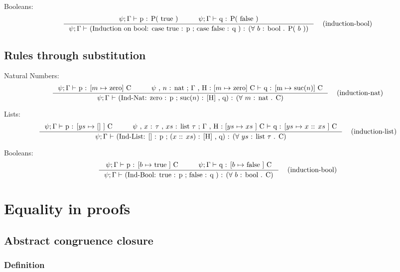 \documentclass[twoside,a4paper]{article}
\theoremstyle{definition}
\begin{document}
Booleans:
\[
\AxiomC{
$\psi ; \Gamma \vdash$ p : P( true )
}
\AxiomC{
$\psi ; \Gamma \vdash$ q : P( false )
}
\RightLabel{\quad (induction-bool)}
\BinaryInfC{
$\psi ; \Gamma \vdash$
(Induction on bool: case true : p ; case false : q )
: ($\forall$ $b$ : bool . P( $b$ ))
}
\DisplayProof
\]

\subsection{Rules through substitution}

Natural Numbers:
\[
\AxiomC{
$\psi ; \Gamma \vdash$ p : [$m$ $\mapsto$ zero] C
}
\AxiomC{
$\psi$ , $n$ : nat ; $\Gamma$ , H : [$m$ $\mapsto$ zero] C $\vdash$ q : [m $\mapsto$ suc($n$)] C
}
\RightLabel{\quad (induction-nat)}
\BinaryInfC{
$\psi ; \Gamma$ $\vdash$
(Ind-Nat: zero : p ; suc($n$) : [H] , q)
: ($\forall$ $m$ : nat . C)
}
\DisplayProof
\]

Lists:
\[
\AxiomC{
$\psi ; \Gamma \vdash$ p : [$ys$ $\mapsto$ [] ] C
}
\AxiomC{
$\psi$ , $x$ : $\tau$ , $xs$ : list $\tau$ ;
$\Gamma$ , H : [$ys$ $\mapsto$ $xs$ ] C $\vdash$ q : [$ys$ $\mapsto$ $x$ :: $xs$ ] C
}
\RightLabel{\quad (induction-list)}
\BinaryInfC{
$\psi ; \Gamma$ $\vdash$
(Ind-List: [] : p ; ($x$ :: $xs$) : [H] , q)
: ($\forall$ $ys$ : list $\tau$ . C)
}
\DisplayProof
\]

Booleans:
\[
\AxiomC{
$\psi ; \Gamma \vdash$ p : [$b$ $\mapsto$ true ] C
}
\AxiomC{
$\psi ; \Gamma \vdash$ q : [$b$ $\mapsto$ false ] C
}
\RightLabel{\quad (induction-bool)}
\BinaryInfC{
$\psi ; \Gamma \vdash$
(Ind-Bool: true : p ; false : q )
: ($\forall$ $b$ : bool . C)
}
\DisplayProof
\]

\section{Equality in proofs}

\subsection{Abstract congruence closure \cite[p.~4--7]{BachmairTV03}}

\subsubsection{Definition}
\end{document}
